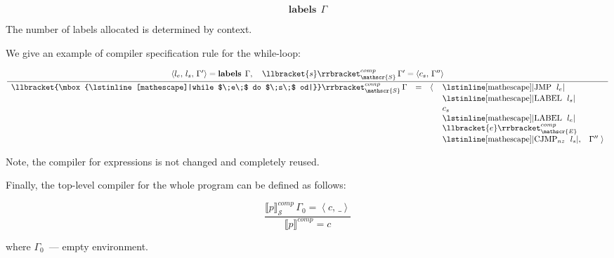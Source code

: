 \documentclass{article}
\newcommand{\trule}[2]{\frac{#1}{#2}}
\newcommand{\llang}[1]{\mbox{\lstinline[mathescape]|#1|}}
\newcommand{\inbr}[1]{\left<{#1}\right>}
\newcommand{\sembr}[1]{\llbracket{#1}\rrbracket}
\newcommand{\primi}[2]{\mathbf{#1}\;{#2}}
\theoremstyle{definition}
\begin{document}
\[
\primi{labels}\,\Gamma
\]

The number of labels allocated is determined by context.

We give an example of compiler specification rule for the while-loop:

\[
\trule{\inbr{l_e,\,l_s,\,\Gamma^\prime}=\primi{labels}\,\Gamma,\quad\sembr{s}_{\mathscr{S}}^{comp}\,\Gamma^\prime=\inbr{c_s,\,\Gamma^{\prime\prime}}}
      {\begin{array}{rcrll}
          \sembr{\llang{while $\;e\;$ do $\;s\;$ od}}_{\mathscr{S}}^{comp}\,\Gamma & = &  \left<\right. & \llang{JMP $\;l_e$}&\\
                                                                    &   &        & \llang{LABEL $\;l_s$}&\\
                                                                    &   &        & c_s&\\
                                                                    &   &        & \llang{LABEL $\;l_e$}&\\
                                                                    &   &        & \sembr{e}^{comp}_{\mathscr{E}}&\\
                                                                    &   &        & \llang{CJMP$_{nz}$ $\;l_s$},&\Gamma^{\prime\prime}\left.\right>
       \end{array}}
\]

Note, the compiler for expressions is not changed and completely reused.

Finally, the top-level compiler for the whole program can be defined as follows:

\[
\trule{\sembr{p}_{\mathscr{S}}^{comp}\,\Gamma_0=\inbr{c,\,\_}}
      {\sembr{p}^{comp}=c}
\]

where $\Gamma_0$~--- empty environment.
\end{document}
